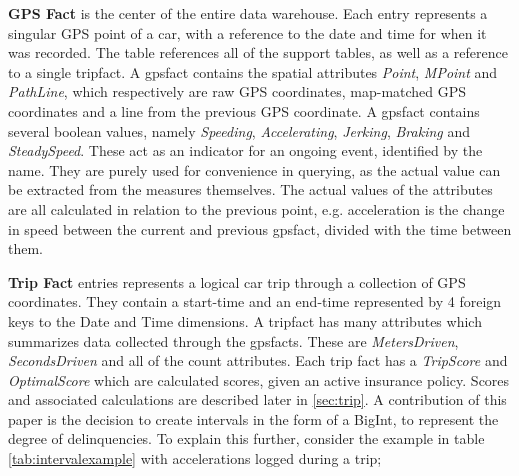 \textbf{GPS Fact} is the center of the entire data warehouse. Each entry represents a singular GPS point of a car, with a reference to the date and time for when it was recorded. The table references all of the support tables, as well as a reference to a single tripfact. A gpsfact contains the spatial attributes \textit{Point}, \textit{MPoint} and \textit{PathLine}, which respectively are raw GPS coordinates, map-matched GPS coordinates and a line from the previous GPS coordinate. A gpsfact contains several boolean values, namely \textit{Speeding}, \textit{Accelerating}, \textit{Jerking}, \textit{Braking} and \textit{SteadySpeed}. These act as an indicator for an ongoing event, identified by the name. They are purely used for convenience in querying, as the actual value can be extracted from the measures themselves. The actual values of the attributes are all calculated in relation to the previous point, e.g. acceleration is the change in speed between the current and previous gpsfact, divided with the time between them.

\textbf{Trip Fact} entries represents a logical car trip through a collection of GPS coordinates. They contain a start-time and an end-time represented by 4 foreign keys to the Date and Time dimensions. A tripfact has many attributes which summarizes data collected through the gpsfacts. These are \textit{MetersDriven}, \textit{SecondsDriven} and all of the count attributes. Each trip fact has a \textit{TripScore} and \textit{OptimalScore} which are calculated scores, given an active insurance policy. Scores and associated calculations are described later in \ref{sec:trip}. A contribution of this paper is the decision to create intervals in the form of a BigInt, to represent the degree of delinquencies. To explain this further, consider the example in table \ref{tab:intervalexample} with accelerations logged during a trip; 

